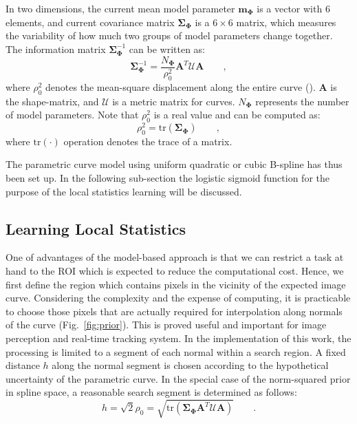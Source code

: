 \documentclass[conference]{IEEEtran}
\begin{document}
In two dimensions, the current mean model parameter
$\mathbf{m}_{\mathbf{\Phi}}$ is a vector with $6$ elements, and current
covariance matrix $\mathbf{\Sigma}_{\mathbf{\Phi}}$ is a $6 \times 6$ matrix, which measures the variability of
how much two groups of model parameters change together. The
information matrix $\mathbf{\Sigma}_{\mathbf{\Phi}}^{-1}$ can be
written as:
\begin{equation}
  \label{eq:infomatrix}
  \mathbf{\Sigma}_{\mathbf{\Phi}}^{-1} = \frac{N_{\mathbf{\Phi}}}{\rho_0^2} \mathbf{A}^T\mathcal{U}\mathbf{A}\qquad,
\end{equation}
where $\rho_0^2$ denotes the mean-square displacement along the entire
curve (\cite{blake1998active}). $\mathbf{A}$ is the shape-matrix, and $\mathcal{U}$ is
a metric matrix for curves. $N_{\mathbf{\Phi}}$ represents
the number of model parameters. Note that $\rho_0^2$
is a real value and can be computed as:
\begin{equation}
  \label{eq:trace}
  \rho_0^2 = \mathrm{tr}(\mathbf{\Sigma}_{\mathbf{\Phi}})\qquad,
\end{equation}
where $\mathrm{tr}(\cdot)$ operation denotes the trace of a matrix.

The parametric curve model using uniform quadratic or
cubic B-spline has thus been set up. In the following sub-section the
logistic sigmoid function for the purpose of the local statistics learning 
will be discussed.

\subsection{Learning Local Statistics}
One of advantages of the
model-based approach is that we can restrict a task at hand to the ROI
which is
expected to reduce the computational cost. Hence, we first define
the region which contains pixels in the vicinity of the expected image
curve. Considering the complexity and the expense of computing, it is practicable
to choose those pixels that are actually required for interpolation along
normals of the curve (Fig.~\ref{fig:prior}). This is proved useful and important for image
perception and real-time tracking system. In the implementation of
this work, the processing is limited to a segment of each normal within
a search region. A fixed distance $h$ along the normal segment is
chosen according to the hypothetical uncertainty of the parametric curve. In the
special case of the norm-squared prior in spline space, a reasonable
search segment is determined as follows:
\begin{equation}
  \label{eq:radius}
  h = \sqrt{2} \rho_0 = \sqrt{\mathrm{tr}(\mathbf{\Sigma}_{\mathbf{\Phi}}\mathbf{A}^T\mathcal{U}\mathbf{A})}\qquad.
\end{equation}
\end{document}
